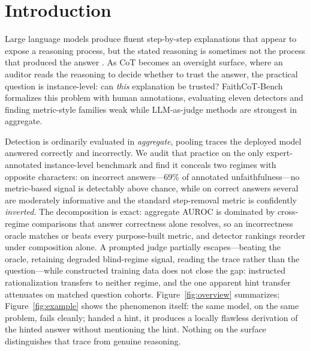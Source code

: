 \documentclass[11pt]{article}
\begin{document}
\section{Introduction}

Large language models produce fluent step-by-step explanations that appear to expose a reasoning process, but the stated reasoning is sometimes not the process that produced the answer \citep{lanham2023measuring,turpin2023language,chen2025reasoning}. As CoT becomes an oversight surface, where an auditor reads the reasoning to decide whether to trust the answer, the practical question is instance-level: can \emph{this} explanation be trusted? FaithCoT-Bench \citep{shen2026faithcot} formalizes this problem with human annotations, evaluating eleven detectors and finding metric-style families weak while LLM-as-judge methods are strongest in aggregate.

Detection is ordinarily evaluated in \emph{aggregate}, pooling traces the deployed model answered correctly and incorrectly. We audit that practice on the only expert-annotated instance-level benchmark and find it conceals two regimes with opposite characters: on incorrect answers---69\% of annotated unfaithfulness---no metric-based signal is detectably above chance, while on correct answers several are moderately informative and the standard step-removal metric is confidently \emph{inverted}. The decomposition is exact: aggregate AUROC is dominated by cross-regime comparisons that answer correctness alone resolves, so an incorrectness oracle matches or beats every purpose-built metric, and detector rankings reorder under composition alone. A prompted judge partially escapes---beating the oracle, retaining degraded blind-regime signal, reading the trace rather than the question---while constructed training data does not close the gap: instructed rationalization transfers to neither regime, and the one apparent hint transfer attenuates on matched question cohorts. Figure~\ref{fig:overview} summarizes; Figure~\ref{fig:example} shows the phenomenon itself: the same model, on the same problem, fails cleanly; handed a hint, it produces a locally flawless derivation of the hinted answer without mentioning the hint. Nothing on the surface distinguishes that trace from genuine reasoning.
\end{document}

